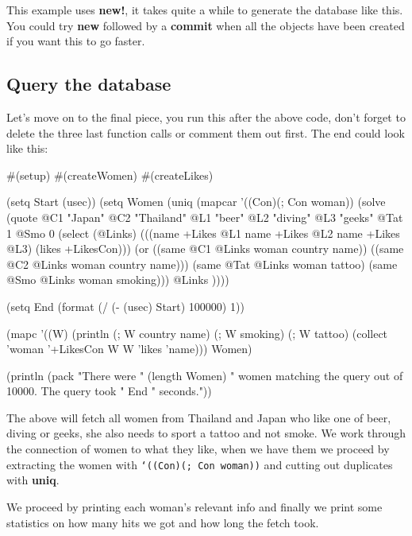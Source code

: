 This example uses \textbf{new!}, it takes quite a while to generate
the database like this. You could try \textbf{new} followed by a
\textbf{commit} when all the objects have been created if you want
this to go faster.


\subsection{Query the database}
\label{sec:prolog-dat-aid-query-the-database}

Let's move on to the final piece, you run this after the above code,
don't forget to delete the three last function calls or comment them out
first. The end could look like this:


\begin{wideverbatim}
#(setup)
#(createWomen)
#(createLikes)

(setq Start (usec))
(setq Women
   (uniq 
      (mapcar '((Con)(; Con woman)) 
         (solve   
            (quote
               @C1 "Japan"
               @C2 "Thailand"
               @L1 "beer"         
               @L2 "diving"         
               @L3 "geeks"         
               @Tat 1
               @Smo 0
               (select (@Links)  
                  (((name +Likes @L1 name +Likes @L2 name +Likes @L3) (likes +LikesCon)))
                  (or
                     ((same @C1 @Links woman country name))
                     ((same @C2 @Links woman country name)))
                  (same @Tat @Links woman tattoo)
                  (same @Smo @Links woman smoking)))   
            @Links ))))
    
(setq End (format (/ (- (usec) Start) 100000) 1))

(mapc 
   '((W)
       (println 
          (; W country name)           
          (; W smoking)          
          (; W tattoo)          
          (collect 'woman '+LikesCon W W 'likes 'name))) Women)
    
(println 
   (pack 
      "There were " 
      (length Women) 
      " women matching the query out of 10000. The query took " 
      End 
      " seconds."))
\end{wideverbatim}

The above will fetch all women from Thailand and Japan who like one of
beer, diving or geeks, she also needs to sport a tattoo and not smoke.
We work through the connection of women to what they like, when we
have them we proceed by extracting the women with \texttt{‘((Con)(;
  Con woman))} and cutting out duplicates with \textbf{uniq}.

We proceed by printing each woman's relevant info and finally we print
some statistics on how many hits we got and how long the fetch took.

